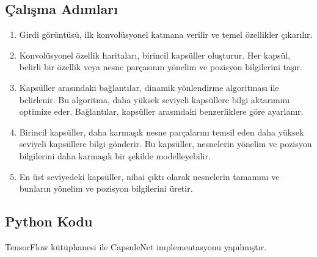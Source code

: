 \subsection{Çalışma Adımları}
\begin{enumerate}
	\item Girdi görüntüsü, ilk konvolüsyonel katmana verilir ve temel özellikler çıkarılır.
	\item Konvolüsyonel özellik haritaları, birincil kapsüller oluşturur. Her kapsül, belirli bir özellik veya nesne parçasının yönelim ve pozisyon bilgilerini taşır.
	\item Kapsüller arasındaki bağlantılar, dinamik yönlendirme algoritması ile belirlenir. Bu algoritma, daha yüksek seviyeli kapsüllere bilgi aktarımını optimize eder. Bağlantılar, kapsüller arasındaki benzerliklere göre ayarlanır.
	\item Birincil kapsüller, daha karmaşık nesne parçalarını temsil eden daha yüksek seviyeli kapsüllere bilgi gönderir. Bu kapsüller, nesnelerin yönelim ve pozisyon bilgilerini daha karmaşık bir şekilde modelleyebilir.
	\item En üst seviyedeki kapsüller, nihai çıktı olarak nesnelerin tamamını ve bunların yönelim ve pozisyon bilgilerini üretir.
\end{enumerate}

\subsection{Python Kodu}

TensorFlow kütüphanesi ile CapsuleNet implementasyonu yapılmıştır.

